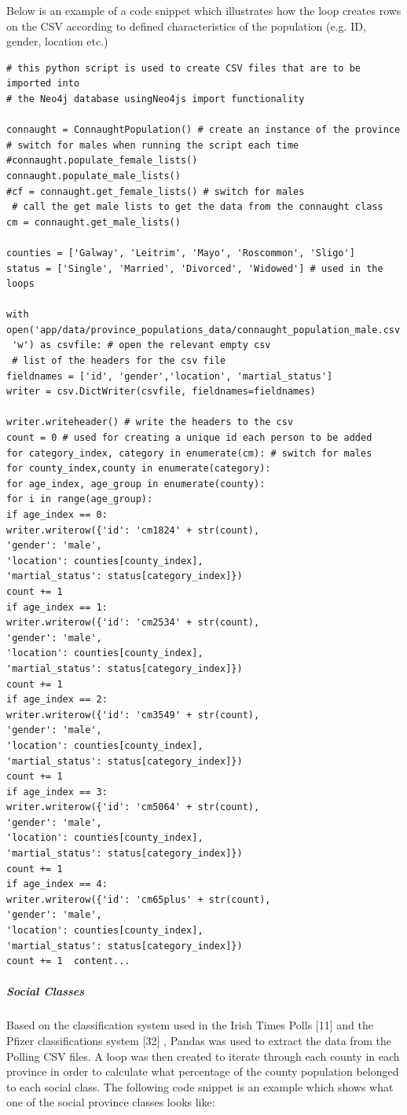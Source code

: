 Below is an example of a code snippet which illustrates how the loop creates rows on the CSV according to defined characteristics of the population (e.g. ID, gender, location etc.) 
\begin{verbatim}
# this python script is used to create CSV files that are to be imported into
# the Neo4j database usingNeo4js import functionality

connaught = ConnaughtPopulation() # create an instance of the province
# switch for males when running the script each time
#connaught.populate_female_lists() 
connaught.populate_male_lists()
#cf = connaught.get_female_lists() # switch for males
 # call the get male lists to get the data from the connaught class
cm = connaught.get_male_lists()

counties = ['Galway', 'Leitrim', 'Mayo', 'Roscommon', 'Sligo']
status = ['Single', 'Married', 'Divorced', 'Widowed'] # used in the loops

with open('app/data/province_populations_data/connaught_population_male.csv',
 'w') as csvfile: # open the relevant empty csv
 # list of the headers for the csv file
fieldnames = ['id', 'gender','location', 'martial_status'] 
writer = csv.DictWriter(csvfile, fieldnames=fieldnames)

writer.writeheader() # write the headers to the csv
count = 0 # used for creating a unique id each person to be added
for category_index, category in enumerate(cm): # switch for males
for county_index,county in enumerate(category):
for age_index, age_group in enumerate(county):
for i in range(age_group):
if age_index == 0:
writer.writerow({'id': 'cm1824' + str(count),
'gender': 'male',
'location': counties[county_index],
'martial_status': status[category_index]})
count += 1
if age_index == 1:
writer.writerow({'id': 'cm2534' + str(count),
'gender': 'male',
'location': counties[county_index],
'martial_status': status[category_index]})
count += 1
if age_index == 2:
writer.writerow({'id': 'cm3549' + str(count),
'gender': 'male',
'location': counties[county_index],
'martial_status': status[category_index]})
count += 1
if age_index == 3:
writer.writerow({'id': 'cm5064' + str(count),
'gender': 'male',
'location': counties[county_index],
'martial_status': status[category_index]})
count += 1
if age_index == 4:
writer.writerow({'id': 'cm65plus' + str(count),
'gender': 'male',
'location': counties[county_index],
'martial_status': status[category_index]})
count += 1	content...
\end{verbatim}
\pagebreak
\subparagraph{Social Classes}
Based on the classification system used in the Irish Times Polls [11] and the Pfizer classifications system [32] ,  Pandas was used to extract the data from the Polling CSV files. A loop was then created to iterate through each county in each province in order to calculate what percentage of the county population belonged to each social class.  The following code snippet is an example which shows what one of the social province classes looks like:

